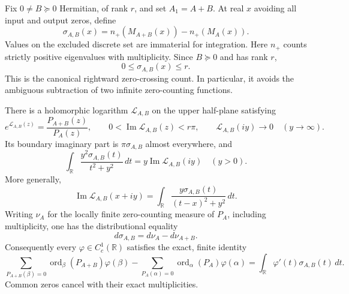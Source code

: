 Fix $0\ne B\succeq0$ Hermitian, of rank $r$, and set $A_1=A+B$.
At real $x$ avoiding all input and output zeros, define
\begin{equation}\label{ut:defshift}
 \sigma_{A,B}(x)=n_+(M_{A+B}(x))-n_+(M_A(x)).
\end{equation}
Values on the excluded discrete set are immaterial for integration.
Here $n_+$ counts strictly positive eigenvalues with multiplicity.
Since $B\succeq0$ and has rank $r$,
\begin{equation}\label{ut:shiftbound}
       0\leq\sigma_{A,B}(x)\leq r.
\end{equation}
This is the canonical rightward zero-crossing count. In particular, it
avoids the ambiguous subtraction of two infinite zero-counting functions.

\begin{theorem}
\label{ut:exact}
There is a holomorphic logarithm $\mathcal L_{A,B}$ on the upper
half-plane satisfying
\[
 e^{\mathcal L_{A,B}(z)}=\frac{P_{A+B}(z)}{P_A(z)},\qquad
 0<\operatorname{Im}\mathcal L_{A,B}(z)<r\pi,
 \qquad \mathcal L_{A,B}(iy)\longrightarrow0\quad(y\to\infty).
\]
Its boundary imaginary part is $\pi\sigma_{A,B}$ almost everywhere, and
\begin{equation}\label{ut:poisson}
 \boxed{\quad
 \int_{\mathbb R}\frac{y^2\sigma_{A,B}(t)}{t^2+y^2}\,dt
       =y\operatorname{Im}\mathcal L_{A,B}(iy)
       \quad(y>0).\quad}
\end{equation}
More generally,
\begin{equation}\label{ut:poisson-general}
 \operatorname{Im}\mathcal L_{A,B}(x+iy)
     =\int_{\mathbb R}\frac{y\sigma_{A,B}(t)}{(t-x)^2+y^2}\,dt.
\end{equation}
Writing $\nu_A$ for the locally finite zero-counting measure of $P_A$,
including multiplicity, one has the distributional equality
\begin{equation}\label{ut:distribution}
         d\sigma_{A,B}=d\nu_A-d\nu_{A+B}.
\end{equation}
Consequently every $\varphi\in C_c^1(\mathbb R)$ satisfies the exact,
finite identity
\begin{equation}\label{ut:testtrace}
 \sum_{P_{A+B}(\beta)=0}\!\operatorname{ord}_\beta(P_{A+B})\varphi(\beta)
 -\sum_{P_A(\alpha)=0}\!\operatorname{ord}_\alpha(P_A)\varphi(\alpha)
   =\int_{\mathbb R}\varphi'(t)\sigma_{A,B}(t)\,dt.
\end{equation}
Common zeros cancel with their exact multiplicities.
\end{theorem}

